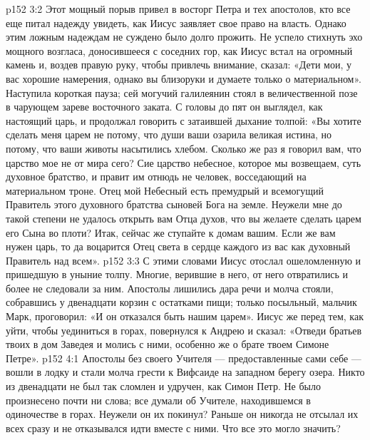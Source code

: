 \vs p152 3:2 Этот мощный порыв привел в восторг Петра и тех апостолов, кто все еще питал надежду увидеть, как Иисус заявляет свое право на власть. Однако этим ложным надеждам не суждено было долго прожить. Не успело стихнуть эхо мощного возгласа, доносившееся с соседних гор, как Иисус встал на огромный камень и, воздев правую руку, чтобы привлечь внимание, сказал: «Дети мои, у вас хорошие намерения, однако вы близоруки и думаете только о материальном». Наступила короткая пауза; сей могучий галилеянин стоял в величественной позе в чарующем зареве восточного заката. С головы до пят он выглядел, как настоящий царь, и продолжал говорить с затаившей дыхание толпой: «Вы хотите сделать меня царем не потому, что души ваши озарила великая истина, но потому, что ваши животы насытились хлебом. Сколько же раз я говорил вам, что царство мое не от мира сего? Сие царство небесное, которое мы возвещаем, суть духовное братство, и правит им отнюдь не человек, восседающий на материальном троне. Отец мой Небесный есть премудрый и всемогущий Правитель этого духовного братства сыновей Бога на земле. Неужели мне до такой степени не удалось открыть вам Отца духов, что вы желаете сделать царем его Сына во плоти? Итак, сейчас же ступайте к домам вашим. Если же вам нужен царь, то да воцарится Отец света в сердце каждого из вас как духовный Правитель над всем».
\vs p152 3:3 \pc С этими словами Иисус отослал ошеломленную и пришедшую в уныние толпу. Многие, верившие в него, от него отвратились и более не следовали за ним. Апостолы лишились дара речи и молча стояли, собравшись у двенадцати корзин с остатками пищи; только посыльный, мальчик Марк, проговорил: «И он отказался быть нашим царем». Иисус же перед тем, как уйти, чтобы уединиться в горах, повернулся к Андрею и сказал: «Отведи братьев твоих в дом Заведея и молись с ними, особенно же о брате твоем Симоне Петре».
\vs p152 4:1 Апостолы без своего Учителя --- предоставленные сами себе --- вошли в лодку и стали молча грести к Вифсаиде на западном берегу озера. Никто из двенадцати не был так сломлен и удручен, как Симон Петр. Не было произнесено почти ни слова; все думали об Учителе, находившемся в одиночестве в горах. Неужели он их покинул? Раньше он никогда не отсылал их всех сразу и не отказывался идти вместе с ними. Что все это могло значить?
